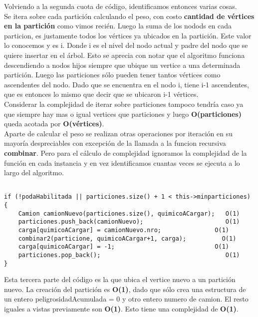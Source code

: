 \noindent 
Volviendo a la segunda cuota de c\'odigo, identificamos entonces varias cosas. \\
Se itera sobre cada partici\'on calculando el peso, con costo \textbf{cantidad de v\'ertices en la partici\'on} como vimos reci\'en.
Luego la suma de los nodods en cada particion, es justamente todos los v\'ertices ya ubicados en la partici\'on. Este valor lo conocemos y es i. Donde i es el nivel del nodo actual y padre del nodo que se quiere insertar en el \'arbol. Esto se aprecia con notar que el algoritmo funciona descendiendo a nodos hijos siempre que ubique un vertice a una determinada partici\'on. Luego las particiones s\'olo pueden tener tantos v\'ertices como ascendentes del nodo. Dado que se encuentra en el nodo i, tiene i-1 ascendentes, que es entonces lo mismo que decir que se ubicaron i-1 v\'ertices.  \\
Considerar la complejidad de iterar sobre particiones tampoco tendr\'ia caso ya que siempre hay mas o igual vertices que particiones y luego \textbf{O(particiones)} queda acotada por \textbf{O(v\'ertices)}.\\
Aparte de calcular el peso se realizan otras operaciones por iteraci\'on en su mayor\'ia despreciables con excepci\'on de la llamada a la funcion recursiva \textbf{combinar}. Pero para el c\'alculo de complejidad ignoramos la complejidad de la funci\'on en cada instancia y en vez identificamos cuantas veces se ejecuta a lo largo del algoritmo.

\begin{lstlisting}

if (!podaHabilitada || particiones.size() + 1 < this->minparticiones) {
	Camion camionNuevo(particiones.size(), quimicoACargar);   O(1)
	particiones.push_back(camionNuevo);                       O(1)
	carga[quimicoACargar] = camionNuevo.nro;               O(1)
	combinar2(particione, quimicoACargar+1, carga);          O(1) 
	carga[quimicoACargar] = -1;                            O(1)
	particiones.pop_back();                                   O(1)
}
\end{lstlisting}

\noindent 
Esta tercera parte del c\'odigo es la que ubica el vertice nuevo a un partici\'on nuevo. La creaci\'on del partici\'on es \textbf{O(1)}, dado que s\'olo crea una estructura de un entero peligrosidadAcumulada = 0 y otro entero numero de camion. El resto iguales a vistas previamente son \textbf{O(1)}. Esto tiene una complejidad de \textbf{O(1)}. \\

